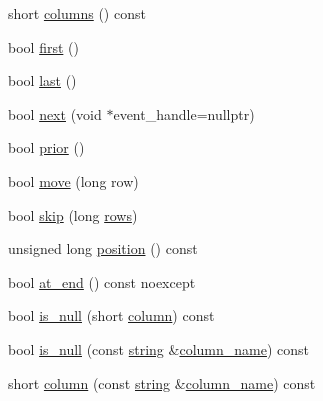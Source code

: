 \begin{DoxyCompactItemize}
\item 
short \mbox{\hyperlink{classnanodbc_1_1result_1_1result__impl_a6ff4deef4702cb3c4b0090d1bac0bb54}{columns}} () const
\item 
bool \mbox{\hyperlink{classnanodbc_1_1result_1_1result__impl_a4c3dd49217ee555ebeac9e4af6e437dc}{first}} ()
\item 
bool \mbox{\hyperlink{classnanodbc_1_1result_1_1result__impl_ab60aed3d32742c851b041542f7aa8559}{last}} ()
\item 
bool \mbox{\hyperlink{classnanodbc_1_1result_1_1result__impl_a2fc6bb46ead0b6add301163698ce9e8b}{next}} (void $\ast$event\+\_\+handle=nullptr)
\item 
bool \mbox{\hyperlink{classnanodbc_1_1result_1_1result__impl_a75c99a62090938df3db2a889f8df6866}{prior}} ()
\item 
bool \mbox{\hyperlink{classnanodbc_1_1result_1_1result__impl_a3c017b0d3caf066deb29a3dc86ad1cd3}{move}} (long row)
\item 
bool \mbox{\hyperlink{classnanodbc_1_1result_1_1result__impl_a911cb068bf7048e2735449909605dd71}{skip}} (long \mbox{\hyperlink{classnanodbc_1_1result_1_1result__impl_a5b821a102ab998eb887155be94f773d7}{rows}})
\item 
unsigned long \mbox{\hyperlink{classnanodbc_1_1result_1_1result__impl_a7e39dd29b851a1fedcd56d75fb2a0480}{position}} () const
\item 
bool \mbox{\hyperlink{classnanodbc_1_1result_1_1result__impl_a0242493a66a2292e0ef1e3e5013298f5}{at\+\_\+end}} () const noexcept
\item 
bool \mbox{\hyperlink{classnanodbc_1_1result_1_1result__impl_ab2f4f63b88a52c826875fdc55a802107}{is\+\_\+null}} (short \mbox{\hyperlink{classnanodbc_1_1result_1_1result__impl_a3863b14d505105da14acf42e7bc4ca03}{column}}) const
\item 
bool \mbox{\hyperlink{classnanodbc_1_1result_1_1result__impl_a1611e6eac2aa51139d6abc1e3031c38f}{is\+\_\+null}} (const \mbox{\hyperlink{namespacenanodbc_abfc0ece56278e590911ec8352774c212}{string}} \&\mbox{\hyperlink{classnanodbc_1_1result_1_1result__impl_a5a02e1effc6a3372b6769d54d04abe2e}{column\+\_\+name}}) const
\item 
short \mbox{\hyperlink{classnanodbc_1_1result_1_1result__impl_a3863b14d505105da14acf42e7bc4ca03}{column}} (const \mbox{\hyperlink{namespacenanodbc_abfc0ece56278e590911ec8352774c212}{string}} \&\mbox{\hyperlink{classnanodbc_1_1result_1_1result__impl_a5a02e1effc6a3372b6769d54d04abe2e}{column\+\_\+name}}) const
\item 

\end{DoxyCompactItemize}
